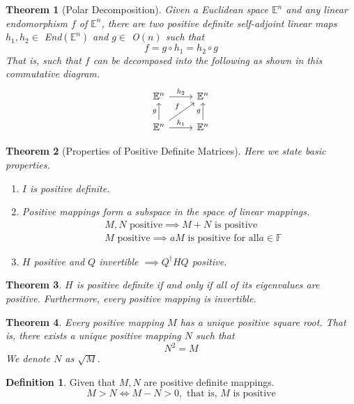 \documentclass{article}
\newtheorem{theorem}{Theorem}[section]
\theoremstyle{remark}
\theoremstyle{definition}
\newtheorem{definition}{Definition}[section]
\begin{document}
\begin{theorem}[Polar Decomposition]
Given a Euclidean space $\mathbb{E}^n$ and any linear endomorphism $f$ of $\mathbb{E}^n$, there are two positive definite self-adjoint linear maps $h_1, h_2 \in$ End$(\mathbb{E}^n)$ and $g \in$ O$(n)$ such that
\[f = g \circ h_1 = h_2 \circ g\]
That is, such that $f$ can be decomposed into the following as shown in this commutative diagram. 
\[\begin{tikzcd}
\mathbb{E}^n \arrow{r}{h_2} & \mathbb{E}^n \\
\mathbb{E}^n \arrow{u}{g} \arrow{ur}{f} \arrow{r}{h_1} & \mathbb{E}^n \arrow{u}{g}
\end{tikzcd}\]
\end{theorem}

\begin{theorem}[Properties of Positive Definite Matrices] Here we state basic properties. 
\begin{enumerate}
    \item $I$ is positive definite. 
    \item Positive mappings form a subspace in the space of linear mappings. 
\begin{align*}
    &M, N \text{ positive} \implies M + N \text{ is positive} \\
    &M \text{ positive} \implies a M \text{ is positive for all} a \in \mathbb{F}
\end{align*}
    \item $H$ positive and $Q$ invertible $\implies Q^\dagger H Q$ positive. 
\end{enumerate}
\end{theorem}

\begin{theorem}
$H$ is positive definite if and only if all of its eigenvalues are positive. Furthermore, every positive mapping is invertible.
\end{theorem}

\begin{theorem}
Every positive mapping $M$ has a unique positive square root. That is, there exists a unique positive mapping $N$ such that
\[ N^2 = M \]
We denote $N$ as $\sqrt{M}$. 
\end{theorem}

\begin{definition}
Given that $M, N$ are positive definite mappings. 
\[M > N \iff M - N > 0, \text{ that is, $M$ is positive}\]
\end{definition}
\end{document}
